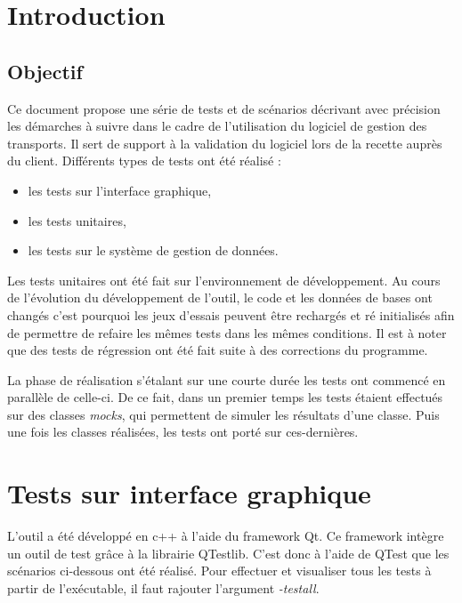 \documentclass[11pt,fleqn]{report}
\begin{document}
    
\ZMakeCover


\ZMakeTableOfContents

\chapter{Introduction}
\section{Objectif}
Ce document propose une série de tests et de scénarios décrivant avec précision les démarches à suivre dans le cadre de l'utilisation du logiciel de gestion des transports. Il sert de support à la validation du logiciel lors de la recette auprès du client.
Différents types de tests ont été réalisé : 
\begin{itemize}
\item les tests sur l'interface graphique,
\item les tests unitaires,
\item les tests sur le système de gestion de données.
\end{itemize}
Les tests unitaires ont été fait sur l'environnement de développement. 
Au cours de l'évolution du développement de l'outil, le code et les données de bases ont changés c'est pourquoi les jeux d'essais peuvent être rechargés  et ré initialisés afin de permettre de refaire les mêmes tests dans les mêmes conditions. 
Il est à noter que des tests de régression ont été fait suite à des corrections du programme.

La phase de réalisation s'étalant sur une courte durée les tests ont commencé en parallèle de celle-ci. De ce fait, dans un premier temps les tests étaient effectués sur des classes \emph{mocks}, qui permettent de simuler les résultats d'une classe. Puis une fois les classes réalisées, les tests ont porté sur ces-dernières.

\chapter{Tests sur interface graphique}
L'outil a été développé en c++ à l'aide du framework Qt. Ce framework intègre un outil de test grâce à la librairie QTestlib.
C'est donc à l'aide de QTest que les scénarios ci-dessous ont été réalisé.
Pour effectuer et visualiser tous les tests à partir de l'exécutable, il faut rajouter l'argument \emph{-testall}.
\end{document}
